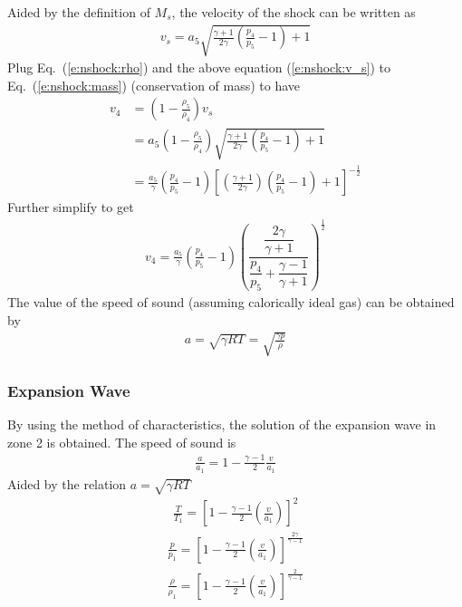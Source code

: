 \documentclass{turgon}
\begin{document}
Aided by the definition of $M_s$, the velocity of the shock can be written as
%
\begin{gather}
  v_s = a_5
  \sqrt{\frac{\gamma + 1}{2\gamma}\left(\frac{p_4}{p_5} - 1\right) + 1}
  \label{e:nshock:v_s}
\end{gather}
%
Plug Eq.~(\ref{e:nshock:rho}) and the above equation (\ref{e:nshock:v_s}) to
Eq.~(\ref{e:nshock:mass}) (conservation of mass) to have
%
\begin{align*}
  v_4 &= \left(1 - \frac{\rho_5}{\rho_4}\right) v_s
  \\
  &= a_5 \left(1 - \frac{\rho_5}{\rho_4}\right)
  \sqrt{\frac{\gamma + 1}{2\gamma}\left(\frac{p_4}{p_5} - 1\right) + 1}
  \\
  &=
  \frac{a_5}{\gamma} \left(\frac{p_4}{p_5} - 1\right)
  \left[
    \left(\frac{\gamma+1}{2\gamma}\right) \left(\frac{p_4}{p_5} - 1\right) + 1
    \right]^{-\frac{1}{2}}
\end{align*}
%
Further simplify to get
%
\begin{align}
  v_4 = \frac{a_5}{\gamma} \left(\frac{p_4}{p_5} - 1\right)
  \left(
  \dfrac{\dfrac{2\gamma}{\gamma+1}}
  {\dfrac{p_4}{p_5} + \dfrac{\gamma-1}{\gamma+1}}
  \right)^{\frac{1}{2}}
  \label{e:nshock:v_4}
\end{align}
%
The value of the speed of sound (assuming calorically ideal gas) can be
obtained by
%
\begin{align*}
  a = \sqrt{\gamma R T} = \sqrt{\frac{\gamma p}{\rho}}
\end{align*}

\subsubsection{Expansion Wave}

By using the method of characteristics, the solution of the expansion wave in
zone 2 is obtained.
The speed of sound is
%
\begin{align}
  \frac{a}{a_1} = 1 - \frac{\gamma - 1}{2}\frac{v}{a_1}
  \label{e:ewave:speedofsound}
\end{align}
%
Aided by the relation $a = \sqrt{\gamma R T}$
%
\begin{align}
  \frac{T}{T_1} =
  \left[1 - \frac{\gamma - 1}{2}\left(\frac{v}{a_1}\right)\right]^2
  \label{e:ewave:temperature}
\end{align}
%
\begin{align}
  \frac{p}{p_1} =
  \left[1 - \frac{\gamma - 1}{2}\left(\frac{v}{a_1}\right)\right]^{
    \frac{2\gamma}{\gamma-1}}
  \label{e:ewave:pressure}
\end{align}
%
\begin{align}
  \frac{\rho}{\rho_1} =
  \left[1 - \frac{\gamma - 1}{2}\left(\frac{v}{a_1}\right)\right]^{
    \frac{2}{\gamma-1}}
  \label{e:ewave:density}
\end{align}
\end{document}
